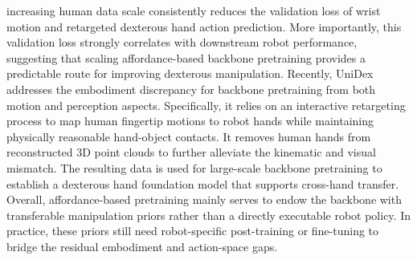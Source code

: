 \documentclass[Afour,sageh,times]{sagej}
\begin{document}
increasing human data scale consistently reduces the validation loss of wrist motion and retargeted
dexterous hand action prediction. More importantly, this validation loss strongly correlates with downstream robot performance, suggesting that scaling affordance-based backbone pretraining provides a predictable route for improving dexterous manipulation. Recently, UniDex~\citep{zhang2026unidex} addresses the embodiment discrepancy for backbone pretraining from both motion and perception aspects. Specifically, it relies on an interactive retargeting process to map human fingertip motions to robot hands while maintaining physically reasonable hand-object contacts. It removes human hands from reconstructed 3D point clouds to further alleviate the kinematic and visual mismatch. The resulting data is used for large-scale backbone pretraining to establish a dexterous hand foundation model that supports cross-hand transfer. Overall, affordance-based pretraining mainly serves to endow the backbone with transferable manipulation priors rather than a directly executable robot policy. In practice, these priors still need robot-specific post-training or fine-tuning to bridge the residual embodiment and action-space gaps.
\end{document}
